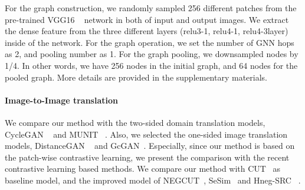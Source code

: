 \documentclass[letterpaper]{article} %
\begin{document}
For the graph construction, we randomly sampled 256 different patches from the pre-trained VGG16 ~\cite{vgg} network in both of input and output images. We extract the dense feature from the three different layers (relu3-1, relu4-1, relu4-3layer) inside of the network. For the graph operation, we set the number of GNN hops as 2, and pooling number as 1. For the graph pooling, we downsampled nodes by 1/4. In other words, we have 256 nodes in the initial graph, and 64 nodes for the pooled graph. 
More details are provided in the supplementary materials.












\paragraph{Image-to-Image translation}



We compare our method with the two-sided domain translation models, CycleGAN ~\cite{cyclegan} and MUNIT ~\cite{munit}. Also, we selected the one-sided image translation models, DistanceGAN ~\cite{distancegan} and GcGAN~\cite{gcgan}.
Especially, since our method is based on the patch-wise contrastive learning, we present the comparison with the recent contrastive learning based methods. We compare our method with CUT~\cite{cut} as baseline model, and the improved model of NEGCUT~\cite{negcut}, SeSim~\cite{sesim} and Hneg-SRC ~\cite{HnegSRC}. 
\end{document}
